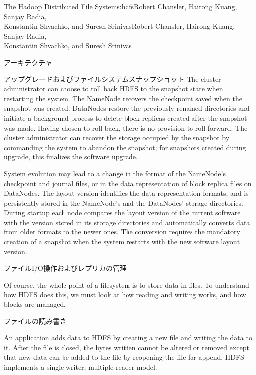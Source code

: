 \begin{aosachaptertoc}{The Hadoop Distributed File System}{s:hdfs}{Robert Chansler, Hairong Kuang, Sanjay Radia, \\ Konstantin Shvachko, and Suresh Srinivas}{Robert Chansler, Hairong Kuang, Sanjay Radia, \\ \hspace*{0.9cm} Konstantin Shvachko, and Suresh Srinivas}
\begin{aosasect1}{アーキテクチャ}
\begin{aosasect2}{アップグレードおよびファイルシステムスナップショット}
The cluster administrator can choose to roll back HDFS to the snapshot
state when restarting the system. The NameNode recovers the checkpoint
saved when the snapshot was created. DataNodes restore the previously
renamed directories and initiate a background process to delete block
replicas created after the snapshot was made. Having chosen to roll
back, there is no provision to roll forward. The cluster administrator
can recover the storage occupied by the snapshot by commanding the
system to abandon the snapshot; for snapshots created during upgrade,
this finalizes the software upgrade.

System evolution may lead to a change in the format of the NameNode's
checkpoint and journal files, or in the data representation of block
replica files on DataNodes. The layout version identifies the data
representation formats, and is persistently stored in the NameNode's
and the DataNodes' storage directories. During startup each node
compares the layout version of the current software with the version
stored in its storage directories and automatically converts data from
older formats to the newer ones. The conversion requires the mandatory
creation of a snapshot when the system restarts with the new software
layout version.

\end{aosasect2}

\end{aosasect1}

\begin{aosasect1}{ファイルI/O操作およびレプリカの管理}

Of course, the whole point of a filesystem is to store data in
files.  To understand how HDFS does this, we must look at how reading
and writing works, and how blocks are managed.

\begin{aosasect2}{ファイルの読み書き}

An application adds data to HDFS by creating a new file and writing
the data to it. After the file is closed, the bytes written cannot be
altered or removed except that new data can be added to the file by
reopening the file for append. HDFS implements a single-writer,
multiple-reader model.


\end{aosasect2}
\end{aosasect1}
\end{aosachaptertoc}
